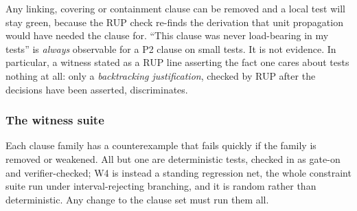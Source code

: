 \documentclass[11pt,a4paper]{article}
\theoremstyle{plain}
\theoremstyle{definition}
\theoremstyle{remark}
\begin{document}
Any linking, covering or containment clause can be removed and a local test will
stay green, because the RUP check re-finds the derivation that unit propagation
would have needed the clause for.  ``This clause was never load-bearing in my
tests'' is \emph{always} observable for a P2 clause on small tests.  It is not
evidence.  In particular, a witness stated as a RUP line asserting the fact one
cares about tests nothing at all: only a \emph{backtracking justification},
checked by RUP after the decisions have been asserted, discriminates.

\subsubsection*{The witness suite}

Each clause family has a counterexample that fails quickly if the family is
removed or weakened.  All but one are deterministic tests, checked in as gate-on
and verifier-checked; W4 is instead a standing regression net, the whole
constraint suite run under interval-rejecting branching, and it is random rather
than deterministic.  Any change to the clause set must run them all.
\end{document}
